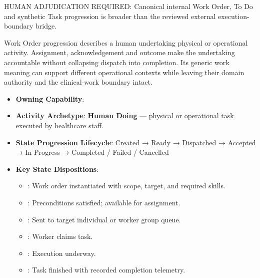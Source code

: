 HUMAN ADJUDICATION REQUIRED: Canonical internal Work Order, To Do and synthetic Task progression is broader than the reviewed external execution-boundary bridge.



Work Order progression describes a human undertaking physical or operational activity. Assignment, acknowledgement and outcome make the undertaking accountable without collapsing dispatch into completion. Its generic work meaning can support different operational contexts while leaving their domain authority and the clinical-work boundary intact.



\begin{itemize}

\item
\textbf{Owning Capability}: \texttt{}



\item
\textbf{Activity Archetype}: \textbf{Human Doing} — physical or operational task executed by healthcare staff.



\item
\textbf{State Progression Lifecycle}: Created → Ready → Dispatched → Accepted → In-Progress → Completed /\allowbreak{} Failed /\allowbreak{} Cancelled



\item
\textbf{Key State Dispositions}:


\begin{itemize}

\item
\texttt{}: Work order instantiated with scope, target, and required skills.



\item
\texttt{}: Preconditions satisfied; available for assignment.



\item
\texttt{}: Sent to target individual or worker group queue.



\item
\texttt{}: Worker claims task.



\item
\texttt{}: Execution underway.



\item
\texttt{}: Task finished with recorded completion telemetry.



\end{itemize}


\end{itemize}

